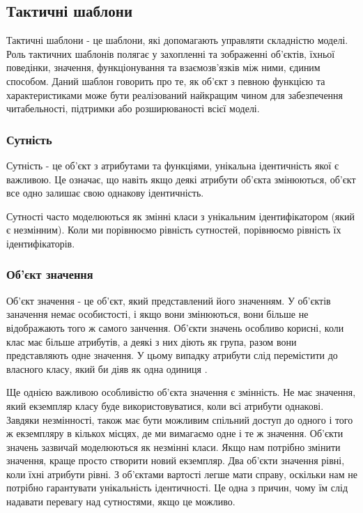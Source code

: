 \subsection{Тактичні шаблони}
Тактичні шаблони - це шаблони, які допомагають управляти складністю моделі.
Роль тактичних шаблонів полягає у захопленні та зображенні об'єктів, їхньої поведінки,
значення, функціонування та взаємозв'язків між ними, єдиним способом.
Даний шаблон говорить про те, як об'єкт з певною функцією та характеристиками
може бути реалізований найкращим чином для забезпечення читабельності,
підтримки або розширюваності всієї моделі.

\subsubsection{Сутність}

Сутність - це об'єкт з атрибутами та функціями, унікальна ідентичність якої є важливою.
Це означає, що навіть якщо деякі атрибути об'єкта змінюються,
об'єкт все одно залишає свою однакову ідентичність.

Сутності часто моделюються як змінні класи з унікальним ідентифікатором (який є незмінним).
Коли ми порівнюємо рівність сутностей, порівнюємо рівність їх ідентифікаторів.

\subsubsection{Об'єкт значення}
Об'єкт значення - це об'єкт, який представлений його значенням.
У об'єктів заначення немає особистості, і якщо вони змінюються,
вони більше не відображають того ж самого занчення. Об'єкти значень особливо корисні,
коли клас має більше атрибутів, а деякі з них діють як група,
разом вони представляють одне значення.
У цьому випадку атрибути слід перемістити до власного класу, який би діяв як одна одиниця \cite{ddd-vernon}.

Ще однією важливою особливістю об'єкта значення є змінність.
Не має значення, який екземпляр класу буде використовуватися,
коли всі атрибути однакові. Завдяки незмінності, також має бути
можливим спільний доступ до одного і того ж екземпляру в кількох місцях,
де ми вимагаємо одне і те ж значення. Об'єкти значень зазвичай
моделюються як незмінні класи. Якщо нам потрібно змінити значення,
краще просто створити новий екземпляр. Два об'єкти значення рівні,
коли їхні атрибути рівні. З об'єктами вартості легше мати справу,
оскільки нам не потрібно гарантувати унікальність ідентичності.
Це одна з причин, чому їм слід надавати перевагу над сутностями, якщо це можливо.

